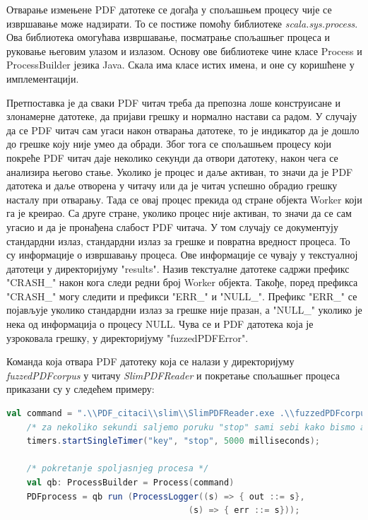 \documentclass[12pt,oneside]{memoir}
\begin{document}
Отварање измењене PDF датотеке се догађа у спољашњем процесу чије се извршавање може надзирати. То се постиже помоћу библиотеке \textit{scala.sys.process}. Ова библиотека омогућава извршавање, посматрање спољашњег процеса и руковање његовим улазом и излазом. Основу ове библиотеке чине класе Process и ProcessBuilder језика Java. Скала има класе истих имена, и оне су коришћене у имплементацији.

Претпоставка је да сваки PDF читач треба да препозна лоше конструисане и злонамерне датотеке, да пријави грешку и нормално настави са радом. У случају да се PDF читач сам угаси након отварања датотеке, то је индикатор да је дошло до грешке коју није умео да обради. Због тога се спољашњем процесу који покреће PDF читач даје неколико секунди да отвори датотеку, након чега се анализира његово стање. Уколико је процес и даље активан, то значи да је PDF датотека и даље отворена у читачу или да је читач успешно обрадио грешку насталу при отварању. Тада се овај процес прекида од стране објекта Worker који га је креирао. Са друге стране, уколико процес није активан, то значи да се сам угасио и да је пронађена слабост PDF читача. У том случају се документују стандардни излаз, стандардни излаз за грешке и повратна вредност процеса. То су информације о извршавању процеса. Ове информације се чувају у текстуалној датотеци у директоријуму "results". Назив текстуалне датотеке садржи префикс "CRASH\_" након кога следи редни број Worker објекта. Такође, поред префикса "CRASH\_" могу следити и префикси "ERR\_" и "NULL\_". Префикс "ERR\_" се појављује уколико стандардни излаз за грешке није празан, а "NULL\_" уколико је нека од информација о процесу NULL. Чува се и PDF датотека која је узроковала грешку, у директоријуму "fuzzedPDFError".

Команда која отвара PDF датотеку која се налази у директоријуму \textit{fuzzedPDFcorpus} у читачу \textit{SlimPDFReader} и покретање спољашњег процеса приказани су у следећем примеру:

\begin{lstlisting}[frame=single, language=Scala]
    val command = ".\\PDF_citaci\\slim\\SlimPDFReader.exe .\\fuzzedPDFcorpus\\" + numberComplete +               "_fuzzed.pdf";
    /* za nekoliko sekundi saljemo poruku "stop" sami sebi kako bismo analizirali stanje procesa */
    timers.startSingleTimer("key", "stop", 5000 milliseconds);

    /* pokretanje spoljasnjeg procesa */
    val qb: ProcessBuilder = Process(command)
    PDFprocess = qb run (ProcessLogger((s) => { out ::= s},
	    					        (s) => { err ::= s}));
\end{lstlisting}
\end{document}
